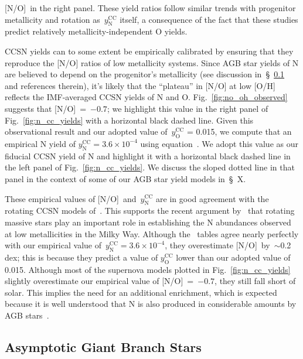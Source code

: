 \documentclass[ms.tex]{subfiles}
\begin{document}
[N/O]\subcc~in the right panel.
These yield ratios follow similar trends with progenitor metallicity and
rotation as~$y_\text{N}^\text{CC}$ itself, a consequence of the fact that these
studies predict relatively metallicity-independent O yields.
\par
CCSN yields can to some extent be empirically calibrated by ensuring that they
reproduce the [N/O] ratios of low metallicity systems.
Since AGB star yields of N are believed to depend on the progenitor's
metallicity (see discussion in~\S~\ref{sec:yields:agb} and references therein),
it's likely that the ``plateau'' in [N/O] at low [O/H] reflects the
IMF-averaged CCSN yields of N and O.
Fig.~\ref{fig:no_oh_observed} suggests that [N/O]\subcc~=~$-0.7$; we highlight
this value in the right panel of Fig.~\ref{fig:n_cc_yields} with a horizontal
black dashed line.
Given this observational result and our adopted value of~$y_\text{O}^\text{CC}$
= 0.015, we compute that an empirical N yield of
$y_\text{N}^\text{CC} = 3.6\times10^{-4}$ using equation~.
We adopt this value as our fiducial CCSN yield of N and highlight it with a
horizontal black dashed line in the left panel of Fig.~\ref{fig:n_cc_yields}.
We discuss the sloped dotted line in that panel in the context of some of our
AGB star yield models in~\S~X.
\par
These empirical values of [N/O]\subcc~and~$y_\text{N}^\text{CC}$ are in good
agreement with the rotating CCSN models of~\citet{Limongi2018}.
This supports the recent argument by~\citet{Grisoni2021} that rotating massive
stars play an important role in establishing the N abundances observed at low
metallicities in the Milky Way.
Although the~\citet{Sukhbold2016} tables agree nearly perfectly with our
empirical value of~$y_\text{N}^\text{CC} = 3.6\times10^{-4}$, they overestimate
[N/O]\subcc~by~$\sim$0.2 dex; this is because they predict a value of
$y_\text{O}^\text{CC}$ lower than our adopted value of 0.015.
Although most of the supernova models plotted in Fig.~\ref{fig:n_cc_yields}
slightly overestimate our empirical value of [N/O]\subcc~=~$-0.7$, they still
fall short of solar.
This implies the need for an additional enrichment, which is expected because
it is well understood that N is also produced in considerable amounts by
AGB stars~\citep{Johnson2019}.


\subsection{Asymptotic Giant Branch Stars}
\label{sec:yields:agb}
\end{document}

